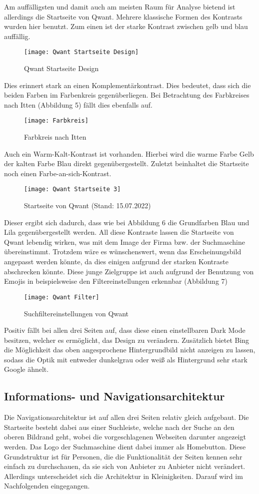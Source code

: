 Am auffälligsten und damit auch am meisten Raum für Analyse bietend ist allerdings die Startseite von Qwant. Mehrere
klassische Formen des Kontrasts wurden hier benutzt. Zum einen ist der starke Kontrast zwischen gelb und blau auffällig.
\begin{figure}[h]
    \centering
    \texttt{[image: Qwant Startseite Design]}
    \caption{Qwant Startseite Design}
\end{figure}
Dies erinnert stark an einen Komplementärkontrast. Dies bedeutet, dass sich die beiden Farben im Farbenkreis gegenüberliegen\cite[Seite 33]{Maulhardt.20220513}.
Bei Betrachtung des Farbkreises nach Itten (Abbildung 5) fällt dies ebenfalls auf.
\begin{figure}[h]
    \centering
    \texttt{[image: Farbkreis]}
    \caption{Farbkreis nach Itten\cite{Farbkreis}}
\end{figure}
Auch ein
Warm-Kalt-Kontrast ist vorhanden. Hierbei wird die warme Farbe Gelb der kalten Farbe Blau direkt gegenübergestellt\cite[Seite 34]{Maulhardt.20220513}.
Zuletzt beinhaltet die Startseite noch einen Farbe-an-sich-Kontrast.
\begin{figure}[h]
    \centering
    \texttt{[image: Qwant Startseite 3]}
    \caption{Startseite von Qwant (Stand: 15.07.2022)}
\end{figure}
Dieser ergibt sich dadurch,
dass wie bei Abbildung 6 die Grundfarben Blau und Lila gegenübergestellt werden\cite[Seite 38]{Maulhardt.20220513}. All diese Kontraste
lassen die Startseite von Qwant lebendig wirken, was mit dem Image der Firma bzw. der Suchmaschine übereinstimmt.
Trotzdem wäre es wünschenswert, wenn das Erscheinungsbild angepasst werden könnte, da dies einigen aufgrund der starken
Kontraste abschrecken könnte. Diese junge Zielgruppe ist auch aufgrund der Benutzung von Emojis in beispielsweise den
Filtereinstellungen erkennbar (Abbildung 7)
\begin{figure}[h]
    \centering
    \texttt{[image: Qwant Filter]}
    \caption{Suchfiltereinstellungen von Qwant}
\end{figure}

Positiv fällt bei allen drei Seiten auf, dass diese einen einstellbaren Dark Mode besitzen, welcher es ermöglicht, das
Design zu verändern. Zusätzlich bietet Bing die Möglichkeit das oben angesprochene Hintergrundbild nicht anzeigen zu lassen,
sodass die Optik mit entweder dunkelgrau oder weiß als Hintergrund sehr stark Google ähnelt.

\subsection{Informations- und Navigationsarchitektur}
Die Navigationsarchitektur ist auf allen drei Seiten relativ gleich aufgebaut. Die Startseite besteht dabei aus einer
Suchleiste, welche nach der Suche an den oberen Bildrand geht, wobei die vorgeschlagenen Webseiten darunter angezeigt werden.
Das Logo der Suchmaschine dient dabei immer als Homebutton. Diese Grundstruktur ist für Personen, die die Funktionalität der
Seiten kennen sehr einfach zu durchschauen, da sie sich von Anbieter zu Anbieter nicht verändert. Allerdings unterscheidet
sich die Architektur in Kleinigkeiten. Darauf wird im Nachfolgenden eingegangen.

